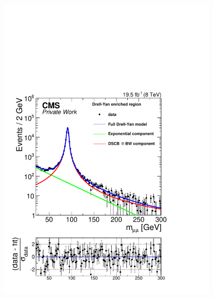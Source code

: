 \begin{figure}[htbp]
\begin{minipage}[t]{0.49\textwidth}
\includegraphics[width=\textwidth]{plots/results/fit/expoFitMM_Log_Central.pdf}
\end{minipage}
\begin{minipage}[t]{0.49\textwidth}

\end{minipage}
\end{figure}
